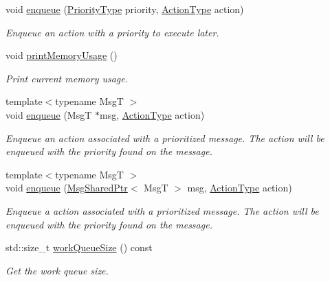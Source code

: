\begin{DoxyCompactItemize}
void \hyperlink{structvt_1_1sched_1_1_scheduler_afb1616da4dfb63b8a83e15af720d9f3f}{enqueue} (\hyperlink{namespacevt_a86bff9f556eb761b27fc8600d006ac04}{Priority\+Type} priority, \hyperlink{namespacevt_ae0a5a7b18cc99d7b732cb4d44f46b0f3}{Action\+Type} action)
\begin{DoxyCompactList}\small\item\em Enqueue an action with a priority to execute later. \end{DoxyCompactList}\item 
void \hyperlink{structvt_1_1sched_1_1_scheduler_a48a6fdb0c7384df09b467c0e68ca8e6f}{print\+Memory\+Usage} ()
\begin{DoxyCompactList}\small\item\em Print current memory usage. \end{DoxyCompactList}\item 
{\footnotesize template$<$typename MsgT $>$ }\\void \hyperlink{structvt_1_1sched_1_1_scheduler_a0005e1bc981fe4f4386659a59e361299}{enqueue} (MsgT $\ast$msg, \hyperlink{namespacevt_ae0a5a7b18cc99d7b732cb4d44f46b0f3}{Action\+Type} action)
\begin{DoxyCompactList}\small\item\em Enqueue an action associated with a prioritized message. The action will be enqueued with the priority found on the message. \end{DoxyCompactList}\item 
{\footnotesize template$<$typename MsgT $>$ }\\void \hyperlink{structvt_1_1sched_1_1_scheduler_a1dd080d38a734d294955aa8293ac9b36}{enqueue} (\hyperlink{namespacevt_ab2b3d506ec8e8d1540aede826d84a239}{Msg\+Shared\+Ptr}$<$ MsgT $>$ msg, \hyperlink{namespacevt_ae0a5a7b18cc99d7b732cb4d44f46b0f3}{Action\+Type} action)
\begin{DoxyCompactList}\small\item\em Enqueue a action associated with a prioritized message. The action will be enqueued with the priority found on the message. \end{DoxyCompactList}\item 
std\+::size\+\_\+t \hyperlink{structvt_1_1sched_1_1_scheduler_a6ee315ffd90f37a277bb2b5622af1f4f}{work\+Queue\+Size} () const
\begin{DoxyCompactList}\small\item\em Get the work queue size. \end{DoxyCompactList}\item 

\end{DoxyCompactItemize}

